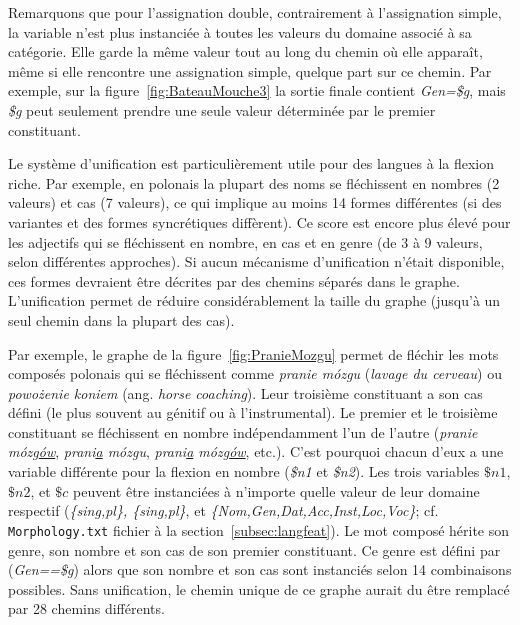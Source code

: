 \bigskip
\noindent Remarquons que pour l'assignation double, contrairement à l'assignation simple, la
variable n'est plus instanciée à toutes les valeurs du domaine associé à sa catégorie. Elle garde la
même valeur tout au long du chemin où elle apparaît, même si elle rencontre une assignation simple,
quelque part sur ce chemin. Par exemple, sur la figure~\ref{fig:BateauMouche3} la sortie finale
contient \emph{Gen=\$g}, mais \emph{\$g} peut seulement prendre une seule valeur
déterminée par le premier constituant.

\bigskip
\noindent Le système d'unification est particulièrement utile pour des langues à la flexion riche.
Par exemple, en polonais la plupart des noms se fléchissent en nombres (2 valeurs) et cas (7
valeurs), ce qui implique au moins 14 formes différentes (si des variantes et des formes
syncrétiques diffèrent).
Ce score est encore plus élevé pour les adjectifs qui se fléchissent en nombre, en cas et en genre
(de 3 à 9 valeurs, selon différentes approches). Si aucun mécanisme d'unification n'était
disponible, ces formes devraient être décrites par des chemins séparés dans le graphe.
L'unification permet de réduire considérablement la taille du graphe (jusqu'à un seul chemin dans la
plupart des cas).

\bigskip
\noindent Par exemple, le graphe de la figure~\ref{fig:PranieMozgu} permet de fléchir les mots
composés polonais qui se fléchissent comme \emph{pranie m\'ozgu} (\emph{lavage du cerveau}) ou
\emph{powo\.zenie koniem} (ang. \emph{horse coaching}). Leur troisième constituant a son cas défini
(le plus souvent au génitif ou à l'instrumental). Le premier et le troisième constituant se
fléchissent en nombre indépendamment l'un de l'autre  (\emph{pranie m\'ozg\underline{\'ow}},
\emph{prani\underline{a} m\'ozgu}, \emph{prani\underline{a} m\'ozg\underline{\'ow}}, etc.).
C'est pourquoi chacun d'eux a une variable différente pour la flexion en nombre  (\emph{\$n1} et
\emph{\$n2}). Les trois variables $\$n1$, $\$n2$, et $\$c$ peuvent être instanciées à n'importe
quelle valeur de leur domaine respectif  (\emph{\{sing,pl\}, \{sing,pl\}}, et
\emph{\{Nom,Gen,Dat,Acc,Inst,Loc,Voc\}}; cf. \verb+Morphology.txt+ fichier à la
section~\ref{subsec:langfeat}).
Le mot composé hérite son genre, son nombre et son cas de son premier constituant. Ce genre est
défini par (\emph{Gen==\$g}) alors que son nombre et son cas sont instanciés selon 14 combinaisons
possibles. Sans unification, le chemin unique de ce graphe aurait du être remplacé par 28 chemins
différents.

